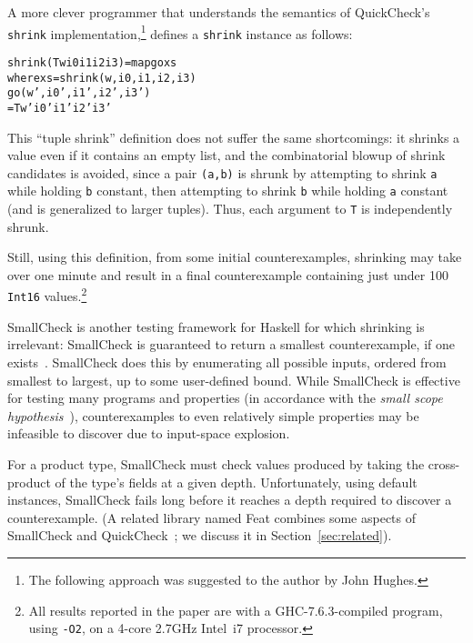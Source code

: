 \documentclass{sigplanconf}
\newenvironment{code}{\begin{alltt}}{\end{alltt}}
\newcommand{\ttp}[1]{\texttt{#1}}
\begin{document}
A more clever programmer that understands the semantics of QuickCheck's
\ttp{shrink} implementation,\footnote{The following approach was suggested to
  the author by John Hughes.} defines a \ttp{shrink} instance as follows:
%
\begin{code}
shrink (T w i0 i1 i2 i3) = map go xs
  where xs = shrink (w, i0, i1, i2, i3)
        go (w', i0', i1', i2', i3')
           = T w' i0' i1' i2' i3'
\end{code}
%
\noindent
This ``tuple shrink'' definition does not suffer the same shortcomings: it
shrinks a value even if it contains an empty list, and the combinatorial blowup
of shrink candidates is avoided, since a pair \ttp{(a,b)} is shrunk by
attempting to shrink \ttp{a} while holding \ttp{b} constant, then attempting to
shrink \ttp{b} while holding \ttp{a} constant (and is generalized to larger
tuples).  Thus, each argument to \ttp{T} is independently shrunk.

Still, using this definition, from some initial counterexamples, shrinking may
take over one minute and result in a final counterexample containing just under
100 \ttp{Int16} values.\footnote{All results reported in the paper are with a
  GHC-7.6.3-compiled program, using \ttp{-O2}, on a 4-core 2.7GHz Intel~i7
  processor.}

SmallCheck is another testing framework for Haskell for which shrinking is
irrelevant: SmallCheck is guaranteed to return a smallest counterexample, if
one exists~\cite{sc}.  SmallCheck does this by enumerating all possible inputs,
ordered from smallest to largest, up to some user-defined bound.  While
SmallCheck is effective for testing many programs and properties (in accordance
with the \emph{small scope hypothesis}~\cite{jackson}), counterexamples to even
relatively simple properties may be infeasible to discover due to input-space
explosion.



For a product type, SmallCheck must check values produced by taking the
cross-product of the type's fields at a given depth.  Unfortunately, using
default instances, SmallCheck fails long before it reaches a depth required to
discover a counterexample.  (A related library named Feat combines some aspects
of SmallCheck and QuickCheck~\cite{feat}; we discuss it in
Section~\ref{sec:related}).
\end{document}
